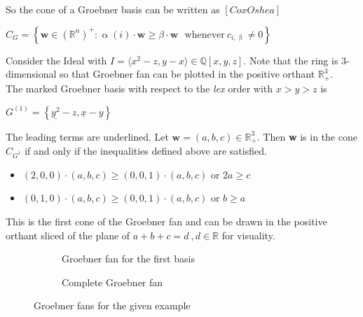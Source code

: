 So the cone of a Groebner basis can be written as $ \left[Cox Oshea \right] $\\
\begin{center}
$C_{G} = \left\lbrace \textbf{w} \in \left(\mathbb{R}^{n}\right)^{+} : \upalpha\left( i\right) \cdot \textbf{w} \geq \beta \cdot \textbf{w}~~~ \textrm{whenever}~ c_{i,\upbeta} \neq 0 \right\rbrace   $
\end{center}


\begin{env_example}\normalfont
Consider the Ideal with $ I = \langle x^{2}-z,y-x \rangle \in \mathbb{Q}\left[ x,y,z\right] .$
Note that the ring is 3-dimensional so that Groebner fan can be plotted in the positive orthant $ \mathbb{R}^{3}_{+}$. \\
The marked Groebner basis with respect to the \textit{lex} order with $x>y>z$ is
\begin{center}
$G^{\left( 1\right) } = \left\lbrace \underline{y^{2}}-z,\underline{x} -y\right\rbrace $
\end{center}
The leading terms are underlined. Let $\textbf{w} = \left( a,b,c\right) \in \mathbb{R}^{3}_{+} $. Then \textbf{w} is in the cone $C_{G^{1}}$ if and only if the inequalities defined above are satisfied.

\begin{itemize}

\item
$\left( 2,0,0\right) \cdot \left( a,b,c\right) \geq \left( 0,0,1\right) \cdot \left( a,b,c\right) $ or $2a\geq c$ 
\item
$\left( 0,1,0\right) \cdot \left( a,b,c\right) \geq \left( 0,0,1\right) \cdot \left( a,b,c\right) $ or $b\geq a$ 

\end{itemize} 

This is the first cone of the Groebner fan and can be drawn in the positive orthant sliced of the plane of $a+b+c=d~,d\in \mathbb{R}$ for visuality.


\begin{figure}
    \centering
    \begin{subfigure}[b]{0.48\linewidth}        %
        \centering
        
        \caption{Groebner fan for the first basis}
        \label{fig:singlegroebner}
    \end{subfigure}
    \begin{subfigure}[b]{0.48\linewidth}        %
        \centering
        
        \caption{Complete Groebner fan}
        \label{fig:completegroebner}
    \end{subfigure}
    \caption{Groebner fans for the given example}
    \label{fig:groebnerfans}
\end{figure}





\end{env_example}
